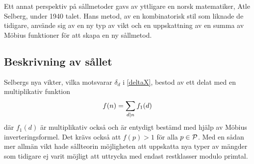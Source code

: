 Ett annat perspektiv på sållmetoder gavs av yttligare en norsk matematiker, Atle Selberg, under 1940 talet. Hans metod, av en kombinatorisk stil som liknade de tidigare, använde sig av en ny typ av vikt och en uppskattning av en summa av Möbius funktioner för att skapa en ny sållmetod.

\subsection{Beskrivning av sållet}
Selbergs nya vikter, vilka motsvarar \(\delta_d\) i \eqref{deltaX}, bestod av ett delat med en multiplikativ funktion 
\begin{equation}
    f(n) = \sum_{d\divides n}f_1(d)\nonumber
\end{equation}
där \(f_1(d)\) är  multiplikativ också och är entydigt bestämd med hjälp av Möbius inverteringsformel. Det krävs också att \(f(p) > 1\) för alla \(p\in\P\). Med en sådan mer allmän vikt hade sållteorin möjligheten att uppskatta nya typer av mängder som tidigare ej varit möjligt att uttrycka med endast restklasser modulo primtal. 

